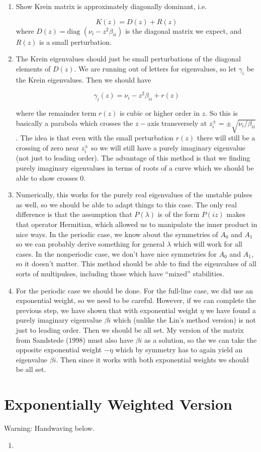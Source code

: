 \documentclass[12pt]{article}
\begin{document}
\begin{enumerate}
\item Show Krein matrix is approximately diagonally dominant, i.e.

\[
K(z) = D(z) + R(z)
\]
where $D(z) = \text{diag }( \nu_i  - z^2 \beta_{ii})$ is the diagonal matrix we expect, and $R(z)$ is a small perturbation. 

\item The Krein eigenvalues should just be small perturbations of the diagonal elements of $D(z)$. We are running out of letters for eigenvalues, so let $\gamma_i$ be the Krein eigenvalues. Then we should have

\[
\gamma_i(z) = \nu_i  - z^2 \beta_{ii} + r(z)
\]

where the remainder term $r(z)$ is cubic or higher order in $z$. So this is basically a parabola which crosses the $z-$axis transversely at $z_i^\pm = \pm \sqrt{\nu_i / \beta_{ii}}$. The idea is that even with the small perturbation $r(z)$ there will still be a crossing of zero near $z_i^\pm$ so we will still have a purely imaginary eigenvalue (not just to leading order). The advantage of this method is that we finding purely imaginary eigenvalues in terms of roots of a curve which we should be able to show crosses 0.

\item Numerically, this works for the purely real eigenvalues of the unstable pulses as well, so we should be able to adapt things to this case. The only real difference is that the assumption that $P(\lambda)$ is of the form $P(iz)$ makes that operator Hermitian, which allowed us to manipulate the inner product in nice ways. In the periodic case, we know about the symmetries of $A_0$ and $A_1$ so we can probably derive something for general $\lambda$ which will work for all cases. In the nonperiodic case, we don't have nice symmetries for $A_0$ and $A_1$, so it doesn't matter. This method should be able to find the eigenvalues of all sorts of multipulses, including those which have ``mixed'' stabilities.

\item For the periodic case we should be done. For the full-line case, we did use an exponential weight, so we need to be careful. However, if we can complete the previous step, we have shown that with exponential weight $\eta$ we have found a purely imaginary eigenvalue $\beta i$ which (unlike the Lin's method version) is not just to leading order. Then we should be all set. My version of the matrix from Sandstede (1998) must also have $\beta i$ as a solution, so the we can take the opposite exponential weight $-\eta$ which by symmetry has to again yield an eigenvalue $\beta i$. Then since it works with both exponential weights we should be all set.

\end{enumerate}

\section*{Exponentially Weighted Version}

Warning: Handwaving below.

\begin{enumerate}
	\item 
\end{enumerate}
\end{document}
